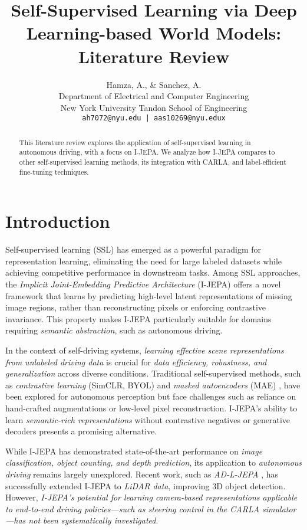 \documentclass{article}
\title{Self-Supervised Learning via Deep Learning-based World Models: Literature Review}
\author{
    Hamza, A., \& Sanchez, A. \\
    Department of Electrical and Computer Engineering \\
    New York University Tandon School of Engineering \\
    \texttt{ah7072@nyu.edu | aas10269@nyu.edux}
}
\begin{document}
\maketitle

\begin{abstract}
    This literature review explores the application of self-supervised learning in autonomous driving, with a focus on I-JEPA. We analyze how I-JEPA compares to other self-supervised learning methods, its integration with CARLA, and label-efficient fine-tuning techniques.
\end{abstract}

\section{Introduction}

Self-supervised learning (SSL) has emerged as a powerful paradigm for representation learning, eliminating the need for large labeled datasets while achieving competitive performance in downstream tasks. Among SSL approaches, the \textit{Implicit Joint-Embedding Predictive Architecture} (I-JEPA) \citep{jean2023ijepa} offers a novel framework that learns by predicting high-level latent representations of missing image regions, rather than reconstructing pixels or enforcing contrastive invariance. This property makes I-JEPA particularly suitable for domains requiring \textit{semantic abstraction}, such as autonomous driving.

In the context of self-driving systems, \textit{learning effective scene representations from unlabeled driving data} is crucial for \textit{data efficiency, robustness, and generalization} across diverse conditions. Traditional self-supervised methods, such as \textit{contrastive learning} (SimCLR, BYOL) \citep{chen2020simple, grill2020bootstrap} and \textit{masked autoencoders} (MAE) \citep{he2022masked}, have been explored for autonomous perception but face challenges such as reliance on hand-crafted augmentations or low-level pixel reconstruction. I-JEPA's ability to learn \textit{semantic-rich representations} without contrastive negatives or generative decoders presents a promising alternative.

While I-JEPA has demonstrated state-of-the-art performance on \textit{image classification, object counting, and depth prediction}, its application to \textit{autonomous driving} remains largely unexplored. Recent work, such as \textit{AD-L-JEPA} \citep{zhu2025adljepa}, has successfully extended I-JEPA to \textit{LiDAR data}, improving 3D object detection. However, \textit{I-JEPA’s potential for learning camera-based representations applicable to end-to-end driving policies—such as steering control in the CARLA simulator—has not been systematically investigated}.
\end{document}
